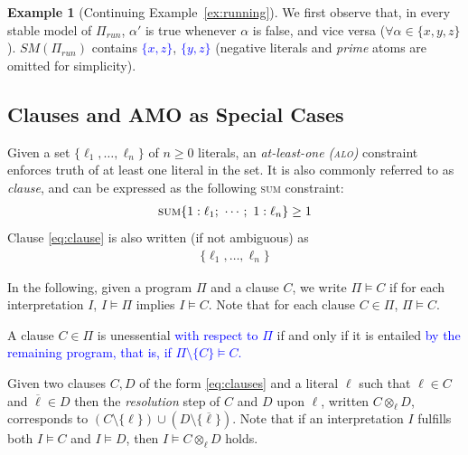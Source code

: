\documentclass[preprint,authoryear]{elsarticle}
\theoremstyle{definition}
\newtheorem{example}{Example}[section]
\begin{document}
\begin{example}[Continuing Example~\ref{ex:running}]\label{ex:semantics}
We first observe that, in every stable model of $\Pi_\mathit{run}$, $\alpha'$ is true whenever $\alpha$ is false, and vice versa ($\forall \alpha \in \{x,y,z\}$).
$\mathit{SM}(\Pi_\mathit{run})$ contains 
\textcolor{blue}{$\{x, z\}$},
\textcolor{blue}{$\{y, z\}$} (negative literals and \emph{prime} atoms are omitted for simplicity).
\end{example}


\subsection{Clauses and AMO as Special Cases}\label{sec:amo}

Given a set $\{\ell_1, \ldots, \ell_n\}$ of $n \geq 0$ literals, an \emph{at-least-one (\textsc{alo})} constraint enforces truth of at least one literal in the set.
It is also commonly referred to as \emph{clause}, and can be expressed as the following \textsc{sum} constraint:
\begin{align}\label{eq:clause}
    \textsc{sum}\{1 : \ell_1;\ \cdots;\ 1 : \ell_n\} \geq 1
\end{align}
Clause \eqref{eq:clause} is also written (if not ambiguous) as
\begin{align}
    \label{eq:clauses}
    \{\ell_1, \ldots, \ell_n\}
\end{align}

In the following, given a program $\Pi$ and a clause $C$, we write $\Pi \models C$ if for each interpretation $I$, $I \models \Pi$ implies $I \models C$.
Note that for each clause $C \in \Pi$, $\Pi \models C$.

A clause $C \in \Pi$ is unessential \textcolor{blue}{with respect to $\Pi$} if and only if it is entailed \textcolor{blue}{by the remaining program, that is, if $\Pi\setminus\{C\}\models C$.}

Given two clauses $C,D$ of the form \eqref{eq:clauses} and a literal 
$\ell$ such that $\ell \in C$ and $\overline{\ell} \in D$ then the \textit{resolution}
\citep{DBLP:journals/jacm/DavisP60,DBLP:journals/jacm/Robinson65}
step of $C$ and $D$ upon $\ell$, written $C \otimes_{\ell} D$, corresponds to 
$(C \setminus \{\ell\}) \cup (D \setminus \{\overline{\ell}\})$.
Note that if an interpretation $I$ fulfills both $I \models C$ and $I \models D$, then $I \models C \otimes_{\ell} D$ holds.
\end{document}

